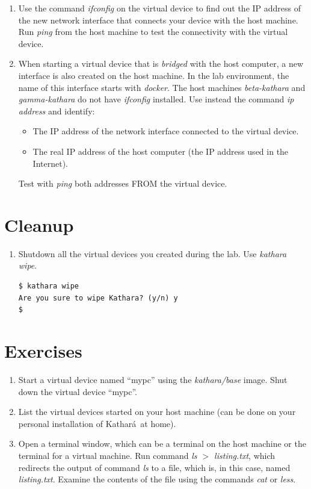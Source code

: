 \documentclass[12pt]{book}
\newcommand{\kathara}{Kathar\'a}
\begin{document}
\begin{enumerate}[label=\arabic*.]
\begin{enumerate}[resume*]
\item Use the command \emph{ifconfig} on the virtual device to find out the IP address of the new network interface that connects your device with the host machine. Run \emph{ping} from the host machine to test the connectivity with the virtual device. 

\item When starting a virtual device that is \emph{bridged} with the host computer, a new interface is also created on the host machine. In the lab environment, the name of this interface starts with \emph{docker}. The host machines \emph{beta-kathara} and \emph{gamma-kathara} do not have \emph{ifconfig} installed. Use instead the command \emph{ip address} and identify:
\begin{itemize}[label=-]
\item The IP address of the network interface connected to the virtual device.
\item The real IP address of the host computer (the IP address used in the Internet).
\end{itemize}
Test with \emph{ping} both addresses FROM the virtual device. 
\end{enumerate}

\section{Cleanup}

\begin{enumerate}[resume*]
\item Shutdown all the virtual devices you created during the lab. Use \emph{kathara wipe}.

\begin{lstlisting}
$ kathara wipe
Are you sure to wipe Kathara? (y/n) y
$ 
\end{lstlisting}
\end{enumerate}

\section{Exercises}

\begin{enumerate}
\item Start a virtual device named ``mypc'' using the \emph{kathara/base} image. Shut down the virtual device ``mypc''.
\item List the virtual devices started on your host machine (can be done on your personal installation of \kathara\ at home).
\item\label{redirect} Open a terminal window, which can be a terminal
  on the host machine or the terminal for a virtual machine. Run
  command \emph{ls $>$ listing.txt}, which redirects the output of command \emph{ls} to a file, which is, in this case, named \emph{listing.txt}. Examine the contents of the file using the commands \emph{cat} or \emph{less}. 


\end{enumerate}
\end{enumerate}
\end{document}
